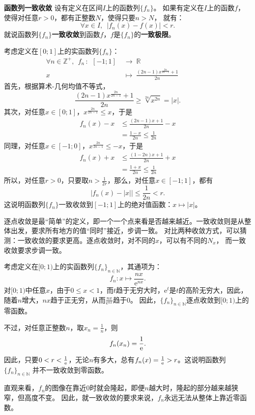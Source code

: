 \documentclass[12pt,UTF8]{ctexbook}
\begin{document}
\begin{df}{\textbf{函数列一致收敛}}
    设有定义在区间$I$上的函数列$\{f_n\}$。
    如果有定义在$I$上的函数$f$，使得对任意$r>0$，都有正整数$N$，使得只要$n>N$，
    就有：
    $$ \forall x\in I, \,\,\,|f_n(x) - f(x) | < r.$$
    就说函数列$\{f_n\}$\textbf{一致收敛}到函数$f$，$f$是$\{f_n\}$的\textbf{一致极限}。
\end{df}

\begin{ex}
    考虑定义在$[0;1]$上的实函数列$\{f_n\}$：
    \begin{align*}
        \forall n\in \mathbb{Z}^+, \;\, f_n \,: \,\; [-1;1]\; &\rightarrow \; \mathbb{R} \\
        x \;&\mapsto \; \frac{(2n-1)x^{\frac{2n}{2n-1}} + 1}{2n} \qquad\qquad\phantom{9} 
    \end{align*}
    首先，根据算术-几何均值不等式，
    $$\frac{(2n-1)x^{\frac{2n}{2n-1}} + 1}{2n} \geqslant \sqrt[2n]{x^{2n}} = |x|.$$
    其次，对任意$x\in [0;1]$，$x^{\frac{2n}{2n-1}} \leqslant x$，于是
    \begin{align*}
        f_n(x) - x &\leqslant \frac{(2n-1)x + 1}{2n} - x \\
        &= \frac{1 - x}{2n} \leqslant \frac{1}{2n}
    \end{align*}
    同理，对任意$x\in [-1;0]$，$x^{\frac{2n}{2n-1}} \leqslant -x$，于是
    \begin{align*}
        f_n(x) + x &\leqslant \frac{(1 - 2n)x + 1}{2n} + x \\
        &= \frac{1 + x}{2n} \leqslant \frac{1}{2n}
    \end{align*}
    所以，对任意$r>0$，只要取$n> \frac{1}{2r}$，那么，对任意$x\in [-1;1]$，都有
    $$\Big|f_n(x) - |x|\Big| \leqslant \frac{1}{2n} < r. $$
    这说明函数列$\{f_n\}$一致收敛到$[-1;1]$上的绝对值函数：$x\mapsto |x|$。
\end{ex}

逐点收敛是最“简单”的定义，即一个一个点来看是否越来越近。一致收敛则是从整体出发，要求所有地方的值“同时”接近，步调一致。
对比两种收敛方式，可以猜测：一致收敛的要求更高。逐点收敛时，对不同的$x$，可以有不同的$N_x$，
而一致收敛要求步调一致。

\begin{ex}
    考虑定义在$[0;1)$上的实函数列$\{f_n\}_{n\in\mathbb{N}}$，其通项为：
    $$ f_n: x \mapsto \frac{nx}{\mathrm{e}^{nx}}. $$
    对$[0;1)$中任意$x$，由于$0\leqslant x<1$，而$t$趋于无穷大时，$\mathrm{e}^t$是$t$的高阶无穷大，因此，随着$n$增大，$nx$趋于正无穷，从而$\frac{nx}{\mathrm{e}^{nx}}$趋于$0$。
    因此，$\{f_n\}_{n\in\mathbb{N}}$逐点收敛到$[0;1)$上的零函数。

    不过，对任意正整数$n$，取$x_n = \frac{1}{n}$，则
    $$f_n(x_n) = \frac{1}{\mathrm{e}}.$$
    因此，只要$0<r <\frac{1}{\mathrm{e}}$，无论$n$有多大，总有$f_n(x) = \frac{1}{\mathrm{e}} > r$。这说明函数列$\{f_n\}_{n\in\mathbb{N}}$
    并不一致收敛到零函数。
    
    直观来看，$f_n$的图像在靠近$0$时就会隆起，即便$n$越大时，隆起的部分越来越狭窄，但高度不变。
    因此，就一致收敛的要求来说，$f_n$永远无法从整体上靠近零函数。

\end{ex}
\end{document}
